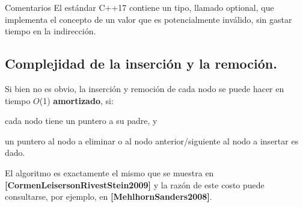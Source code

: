 \begin{DoxyRemark}{Comentarios}
El estándar C++17 contiene un tipo, llamado optional, que implementa el concepto de un valor que es potencialmente inválido, sin gastar tiempo en la indirección.
\end{DoxyRemark}
\hypertarget{Implementacion_Inserciones}{}\subsection{Complejidad de la inserción y la remoción.}\label{Implementacion_Inserciones}
Si bien no es obvio, la inserción y remoción de cada nodo se puede hacer en tiempo $O$(1) {\bfseries amortizado}, si\+:
\begin{DoxyItemize}
\item cada nodo tiene un puntero a su padre, y
\item un puntero al nodo a eliminar o al nodo anterior/siguiente al nodo a insertar es dado.
\end{DoxyItemize}

El algoritmo es exactamente el mismo que se muestra en {\bfseries [Cormen\+Leiserson\+Rivest\+Stein2009]} y la razón de este costo puede consultarse, por ejemplo, en {\bfseries [Mehlhorn\+Sanders2008]}. 